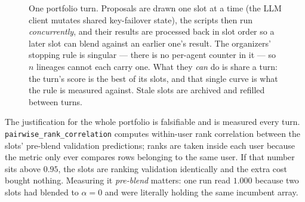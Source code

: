 \documentclass[11pt,a4paper]{article}
\newcommand{\code}[1]{\texttt{#1}}
\begin{document}
\begin{figure}[htbp]
\centering
{}
\caption{One portfolio turn. Proposals are drawn one slot at a time (the LLM client mutates
shared key-failover state), the scripts then run \emph{concurrently}, and their results are
processed back in slot order so a later slot can blend against an earlier one's result. The
organizers' stopping rule is singular --- there is no per-agent counter in it --- so $n$ lineages
cannot each carry one. What they \emph{can} do is share a turn: the turn's score is the best of
its slots, and that single curve is what the rule is measured against. Stale slots are archived
and refilled between turns.}
\label{fig:turn}
\end{figure}

The justification for the whole portfolio is falsifiable and is measured every turn.
\code{pairwise\_rank\_correlation} computes within-user rank correlation between the slots'
pre-blend validation predictions; ranks are taken inside each user because the metric only ever
compares rows belonging to the same user. If that number sits above $0.95$, the slots are ranking
validation identically and the extra cost bought nothing. Measuring it \emph{pre-blend} matters:
one run read $1.000$ because two slots had blended to $\alpha = 0$ and were literally holding the
same incumbent array.

\end{document}
